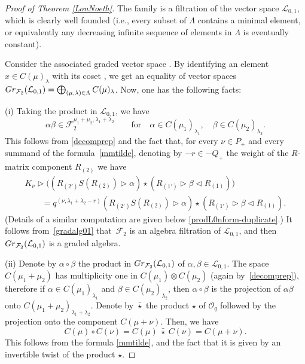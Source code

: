 \documentclass[11pt]{article}
\numberwithin{equation}{section}
\numberwithin{equation}{section}
\theoremstyle{definition}
\newcommand{\Ll}{{\mathcal L}}
\newcommand{\Oo}{{\mathcal O}}
\begin{document}
\begin{proof}[Proof of Theorem \ref{LonNoeth}]
The family  is a filtration of the vector space $ {\mathcal L}_{0,1}$, which is clearly well founded (i.e., every subset of $\Lambda$ contains a minimal element, or equivalently any decreasing infinite sequence of elements in $\Lambda$ is eventually constant).

Consider the associated graded vector space . By identifying an element $x\in C(\mu)_\lambda$ with its coset , we get an equality of vector spaces $ {\rm Gr}_{{\mathcal F}_2}({\mathcal L}_{0,1})= \bigoplus_{(\mu,\lambda)\in \Lambda} C(\mu)_\lambda$. Now, one has the following facts:

(i) Taking the product in $\Ll_{0,1}$, we have
\begin{equation}\label{gradalg01}
\alpha \beta\in {\mathcal F}_2^{\mu_1+\mu_2,\lambda_1+\lambda_2}\qquad \mathrm{for}\quad \alpha \in C(\mu_1)_{\lambda_1},\quad \beta \in C(\mu_2)_{\lambda_2}.
\end{equation}
This follows from \eqref{decomprep} and the fact that, for every $\nu\in P_+$ and every summand of the formula~\eqref{mmtilde}, denoting by $-r\in -Q_+$ the weight of the $R$-matrix component $R_{(2)}$ we have
\begin{gather*}%
K_\nu\rhd \bigl((R_{(2')}{S}(R_{(2)}) \rhd \alpha) \star (R_{(1')}\rhd \beta \lhd R_{(1)})\bigr) \\
\qquad= q^{(\nu,\lambda_1+\lambda_2-r)}(R_{(2')}{S}(R_{(2)}) \rhd \alpha) \star (R_{(1')}\rhd \beta \lhd R_{(1)}).
\end{gather*}
(Details of a similar computation are given below \eqref{prodL0nform-duplicate}.) It follows from~\eqref{gradalg01} that~$\mathcal{F}_2$ is an algebra filtration of $\Ll_{0,1}$, and then ${\rm Gr}_{\mathcal F_2}({\mathcal L}_{0,1})$ is a graded algebra.

(ii) Denote by $\alpha \circ \beta$ the product in $ {\rm Gr}_{{\mathcal F}_2}({\mathcal L}_{0,1})$ of $\alpha,\beta\in \Ll_{0,1}$. The space $C(\mu_1+\mu_2)$ has multiplicity one in $C(\mu_1)\otimes C(\mu_2)$ (again by~\eqref{decomprep}), therefore if $\alpha \in C(\mu_1)_{\lambda_1}$ and $\beta \in C(\mu_2)_{\lambda_2}$, then $\alpha \circ \beta$ is the projection of $\alpha \beta$ onto $C(\mu_1+\mu_2)_{\lambda_1+\lambda_2}$.
 Denote by $\bar{\star}$ the product $\star$ of $\Oo_q$ followed by the projection onto the component $C(\mu + \nu)$. Then, we have
\begin{equation}\label{filtration=}
C(\mu) \circ C(\nu) = C(\mu)\ \bar{\star} \ C(\nu) = C(\mu + \nu).
\end{equation}
This follows from the formula \eqref{mmtilde}, and the fact that it is given by an invertible twist of the product $\star$.


\end{proof}
\end{document}
